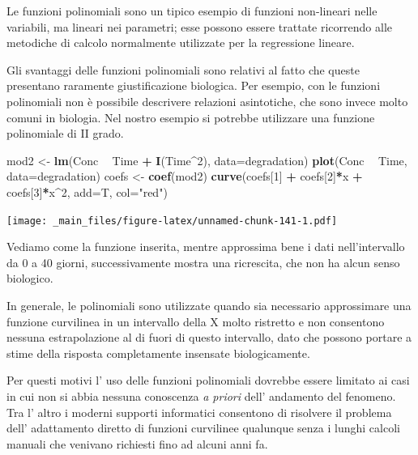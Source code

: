 \documentclass[a4paper,12pt,oneside]{book}
\newenvironment{Shaded}{\begin{snugshade}}{\end{snugshade}}
\newcommand{\KeywordTok}[1]{\textcolor[rgb]{0.13,0.29,0.53}{\textbf{#1}}}
\newcommand{\DataTypeTok}[1]{\textcolor[rgb]{0.13,0.29,0.53}{#1}}
\newcommand{\DecValTok}[1]{\textcolor[rgb]{0.00,0.00,0.81}{#1}}
\newcommand{\StringTok}[1]{\textcolor[rgb]{0.31,0.60,0.02}{#1}}
\newcommand{\OperatorTok}[1]{\textcolor[rgb]{0.81,0.36,0.00}{\textbf{#1}}}
\newcommand{\NormalTok}[1]{#1}
\theoremstyle{definition}
\theoremstyle{definition}
\theoremstyle{definition}
\theoremstyle{remark}
\begin{document}
Le funzioni polinomiali sono un tipico esempio di funzioni non-lineari
nelle variabili, ma lineari nei parametri; esse possono essere trattate
ricorrendo alle metodiche di calcolo normalmente utilizzate per la
regressione lineare.

Gli svantaggi delle funzioni polinomiali sono relativi al fatto che
queste presentano raramente giustificazione biologica. Per esempio, con
le funzioni polinomiali non è possibile descrivere relazioni
asintotiche, che sono invece molto comuni in biologia. Nel nostro
esempio si potrebbe utilizzare una funzione polinomiale di II grado.

\begin{Shaded}
\begin{Highlighting}[]
\NormalTok{mod2 <-}\StringTok{ }\KeywordTok{lm}\NormalTok{(Conc }\OperatorTok{~}\StringTok{ }\NormalTok{Time }\OperatorTok{+}\StringTok{ }\KeywordTok{I}\NormalTok{(Time}\OperatorTok{^}\DecValTok{2}\NormalTok{), }\DataTypeTok{data=}\NormalTok{degradation)}
\KeywordTok{plot}\NormalTok{(Conc }\OperatorTok{~}\StringTok{ }\NormalTok{Time, }\DataTypeTok{data=}\NormalTok{degradation)}
\NormalTok{coefs <-}\StringTok{ }\KeywordTok{coef}\NormalTok{(mod2)}
\KeywordTok{curve}\NormalTok{(coefs[}\DecValTok{1}\NormalTok{] }\OperatorTok{+}\StringTok{ }\NormalTok{coefs[}\DecValTok{2}\NormalTok{]}\OperatorTok{*}\NormalTok{x }\OperatorTok{+}\StringTok{ }\NormalTok{coefs[}\DecValTok{3}\NormalTok{]}\OperatorTok{*}\NormalTok{x}\OperatorTok{^}\DecValTok{2}\NormalTok{, }\DataTypeTok{add=}\NormalTok{T, }\DataTypeTok{col=}\StringTok{"red"}\NormalTok{)}
\end{Highlighting}
\end{Shaded}

\texttt{[image: \_main\_files/figure-latex/unnamed-chunk-141-1.pdf]}

Vediamo come la funzione inserita, mentre approssima bene i dati
nell'intervallo da 0 a 40 giorni, successivamente mostra una ricrescita,
che non ha alcun senso biologico.

In generale, le polinomiali sono utilizzate quando sia necessario
approssimare una funzione curvilinea in un intervallo della X molto
ristretto e non consentono nessuna estrapolazione al di fuori di questo
intervallo, dato che possono portare a stime della risposta
completamente insensate biologicamente.

Per questi motivi l' uso delle funzioni polinomiali dovrebbe essere
limitato ai casi in cui non si abbia nessuna conoscenza \emph{a priori}
dell' andamento del fenomeno. Tra l' altro i moderni supporti
informatici consentono di risolvere il problema dell' adattamento
diretto di funzioni curvilinee qualunque senza i lunghi calcoli manuali
che venivano richiesti fino ad alcuni anni fa.
\end{document}
